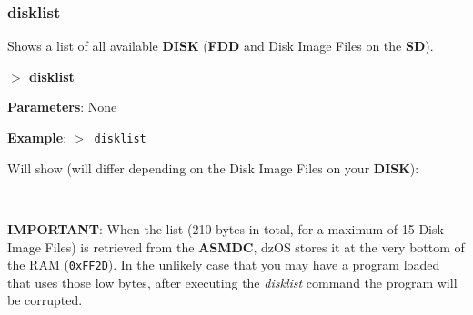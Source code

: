 \documentclass[a4paper,11pt]{article}
\begin{document}
        \subsubsection{{\color{blue}disklist}}
        Shows a list of all available \textbf{DISK} (\textbf{FDD} and Disk Image
        Files on the \textbf{SD}).

        \hspace{1.9cm}\textbf{$>$ disklist}

        \textbf{Parameters}: None

        \textbf{Example}: \texttt{$>$ disklist}

        Will show (will differ depending on the Disk Image Files on your
        \textbf{DISK}):

        \texttt{
        }

        \textbf{IMPORTANT}: When the list (210 bytes in total, for a maximum of
        15 Disk Image Files) is retrieved from the \textbf{ASMDC}, dzOS stores
        it at the very bottom of the RAM (\texttt{0xFF2D}). In the unlikely case
        that you may have a program loaded that uses those low bytes, after
        executing the \textit{disklist} command the program will be corrupted.

\end{document}
